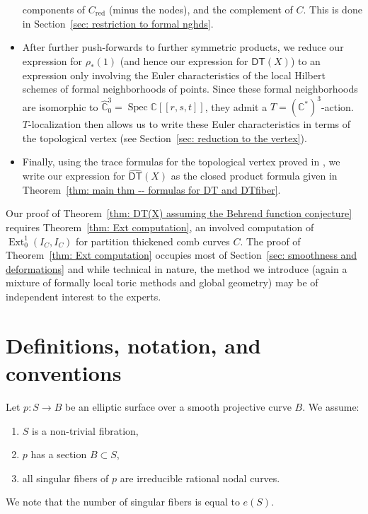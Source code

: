 \documentclass[12pt]{amsart}
\theoremstyle{definition}
\newcommand{\CC} {\mathbb{C}}          %
\newcommand{\Ext}{\operatorname{Ext}}
\newcommand{\DT}{\mathsf{DT}}
\newcommand{\Spec}{\operatorname{Spec}}
\renewcommand{\hat}{\widehat}
\newcommand{\DThat}{\widehat{\DT}}
\newcommand{\red}{\mathrm{red}}
\begin{document}
\begin{itemize}
components of $C_{\red}$ (minus the nodes), and the complement of
$C$. This is done in Section~\ref{sec: restriction
to formal nghds}. 
\item After further push-forwards to further symmetric products, we
reduce our expression for $\rho_{*}(1)$ (and hence our expression for
$\DThat (X)$) to an expression only involving the Euler
characteristics of the local Hilbert schemes of formal neighborhoods
of points. Since these formal neighborhoods are isomorphic to
$\hat{\CC}^{3}_{0}=\Spec \CC [[r,s,t]]$, they admit a $T=\left(\CC^{*}
\right)^{3}$-action. $T$-localization then allows us to write these
Euler characteristics in terms of the topological vertex (see
Section~\ref{sec: reduction to the vertex}). 
\item Finally, using the trace formulas for the topological vertex
proved in \cite{Bryan-Kool-Young}, we write our expression for
$\DThat (X)$ as the closed product formula given in Theorem~\ref{thm:
main thm -- formulas for DT and DTfiber}. 
\end{itemize}

Our proof of Theorem~\ref{thm: DT(X) assuming the Behrend
function conjecture} requires Theorem~\ref{thm: Ext computation}, an
involved computation of $\Ext^{1}_{0}(I_{C},I_{C})$ for partition
thickened comb curves $C$. The proof of Theorem~\ref{thm: Ext
computation} occupies most of Section~\ref{sec: smoothness and
deformations} and while technical in nature, the method we introduce
(again a mixture of formally local toric methods and global geometry)
may be of independent interest to the experts.


\section{Definitions, notation, and conventions}

Let $p : S \rightarrow B$ be an elliptic surface over a smooth
projective curve $B$. We assume:
\begin{enumerate}
\item $S$ is a non-trivial fibration,
\item $p$ has a section $B \subset S$,
\item all singular fibers of $p$ are irreducible rational nodal curves. 
\end{enumerate}
We note that the number of singular fibers is equal to $e(S)$.
\end{document}
